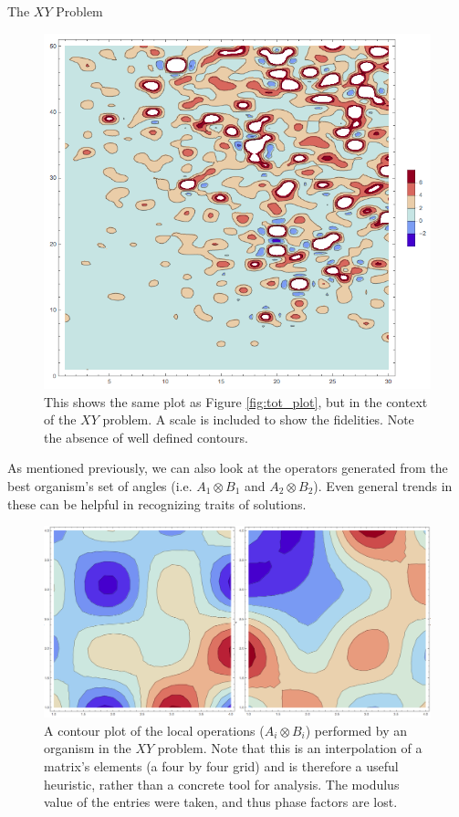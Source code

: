 \documentclass[12pt]{beamer}
\renewcommand{\maketitle}{%
	\begin{center}%
		\Huge\inserttitle\\[5mm]%
		\Large\insertauthor\\[5mm]%
		\Large\insertinstitute%
	\end{center}%
	\vspace*{-1.5ex}%
}
\begin{document}
\begin{frame}{\maketitle}
\begin{columns}
\begin{column}{.45\textwidth}
\begin{exampleblock}{The $XY$ Problem}
	\begin{figure}[htpb]
		\centering
			\includegraphics[scale=0.6]{xyPlot_50O_20G.png}
		\centering
		\caption{This shows the same plot as Figure \ref{fig:tot_plot}, but in the context of the $XY$ problem. A scale is included to show the fidelities. Note the absence of well defined contours.}
		\label{fig:xy_plot}
	\end{figure}    
    As mentioned previously, we can also look at the operators generated from the best organism's set of angles (i.e. $A_1 \otimes B_1$ and $A_2 \otimes B_2$). Even general trends in these can be helpful in recognizing traits of solutions.
    \begin{figure}[htpb]
		\centering
			\includegraphics[scale=0.5]{xy_test_matrices.png}
		\centering
		\caption{A contour plot of the local operations ($A_i \otimes B_i$) performed by an organism in the $XY$ problem. Note that this is an interpolation of a matrix's elements (a four by four grid) and is therefore a useful heuristic, rather than a concrete tool for analysis. The modulus value of the entries were taken, and thus phase factors are lost.}
		\label{fig:xy_matrix}
	\end{figure}


\end{exampleblock}
\end{column}
\end{columns}
\end{frame}
\end{document}
